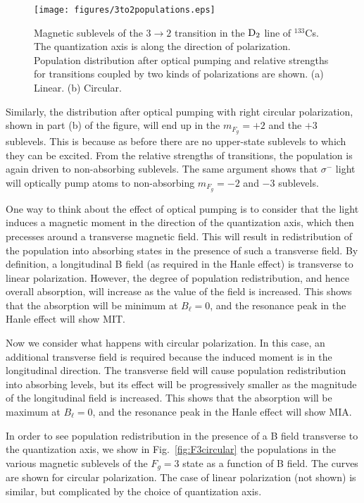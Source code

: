 \begin{figure}
	\centering
	\texttt{[image: figures/3to2populations.eps]}
	\caption{Magnetic sublevels of the $ 3 \rightarrow 2 $ transition in the $\rm D_2 $ line of $^{133}$Cs. The quantization axis is along the direction of polarization. Population distribution after optical pumping and relative strengths for transitions coupled by two kinds of polarizations are shown. (a) Linear. (b) Circular.}
	\label{fig:3to2populations}
\end{figure}

Similarly, the distribution after optical pumping with right circular polarization, shown in part (b) of the figure, will end up in the $ m_{F_g} = +2 $ and the $+3$ sublevels. This is because as before there are no upper-state sublevels to which they can be excited. From the relative strengths of transitions, the population is again driven to non-absorbing sublevels. The same argument shows that $ \sigma^- $ light will optically pump atoms to non-absorbing $ m_{F_g} = -2 $ and $ -3 $ sublevels.

One way to think about the effect of optical pumping is to consider that the light induces a magnetic moment in the direction of the quantization axis, which then precesses around a transverse magnetic field. This will result in redistribution of the population into absorbing states in the presence of such a transverse field. By definition, a longitudinal B field (as required in the Hanle effect) is transverse to linear polarization. However, the degree of population redistribution, and hence overall absorption, will increase as the value of the field is increased. This shows that the absorption will be minimum at $ B_{\ell} = 0 $, and the resonance peak in the Hanle effect will show MIT.

Now we consider what happens with circular polarization. In this case, an additional transverse field is required because the induced moment is in the longitudinal direction. The transverse field will cause population redistribution into absorbing levels, but its effect will be progressively smaller as the magnitude of the longitudinal field is increased. This shows that the absorption will be maximum at $ B_{\ell} =0 $, and the resonance peak in the Hanle effect will show MIA.

In order to see population redistribution in the presence of a B field transverse to the quantization axis, we show in Fig.~\ref{fig:F3circular} the populations in the various magnetic sublevels of the $F_g = 3 $ state as a function of B field. The curves are shown for circular polarization. The case of linear polarization (not shown) is similar, but complicated by the choice of quantization axis.

